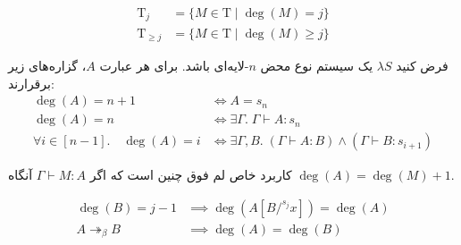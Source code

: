 \begin{defn}
\begin{align*}
\mathrm{T}_j &= \{M \in \mathrm{T} \mid \operatorname{deg}(M) = j\}\\
\mathrm{T}_{\ge j} &= \{M \in \mathrm{T} \mid \operatorname{deg}(M) \ge j\}
\end{align*}
\end{defn}

\begin{lmm}
فرض کنید
$\lambda S$
یک سیستم نوع محض
$n$-لایه‌ای
باشد.
برای هر عبارت
$A$،
گزاره‌های زیر برقرارند:
\begin{align*}
\operatorname{deg}(A) = n + 1 &\iff A = s_n\\
\operatorname{deg}(A) = n &\iff \exists \Gamma.\; \Gamma \vdash A : s_n\\
\forall i \in [n-1]. \quad \operatorname{deg}(A) = i &\iff \exists \Gamma,B.\; (\Gamma \vdash A:B) \land (\Gamma \vdash B:s_{i+1})
\end{align*}
\end{lmm}

کاربرد خاص لم فوق چنین است که اگر
$\Gamma \vdash M:A$
آنگاه
$\operatorname{deg}(A) = \operatorname{deg}(M) + 1$.

\begin{lmm}\label{lmm11}
\begin{align*}
\operatorname{deg}(B) = j - 1 &\implies \operatorname{deg}(A[B/^{s_j}x]) = \operatorname{deg}(A)\\
A \twoheadrightarrow_\beta B &\implies \operatorname{deg}(A) = \operatorname{deg}(B)
\end{align*}
\end{lmm}


